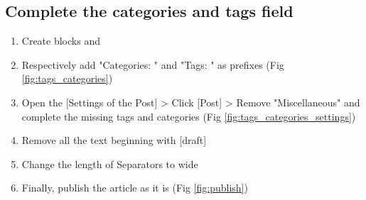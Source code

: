 \newpage
\subsection*{Complete the categories and tags field}\label{ssec:categories}
\begin{enumerate}
    \item Create blocks  and 
    \item Respectively add "Categories: " and "Tags: " as prefixes (Fig \ref{fig:tags_categories})
    \item Open the [Settings of the Post] > Click [Post] > Remove "Miscellaneous" and complete the missing tags and categories (Fig \ref{fig:tags_categories_settings})
    \item Remove all the text beginning with [draft]
    \item Change the length of Separators to wide
    \item Finally, publish the article as it is (Fig \ref{fig:publish})
\end{enumerate}

